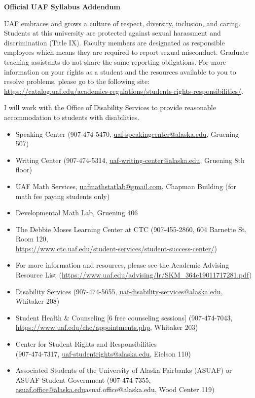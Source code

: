 \documentclass[12pt]{article}
\def\mailto#1{\href{mailto:#1}{#1}}
\begin{document}
\begin{center}
\textbf{\large{Official UAF Syllabus Addendum}}
\end{center}


 UAF embraces and grows a culture of respect, diversity, inclusion, and caring. Students at this university are protected against sexual harassment and discrimination (Title IX). Faculty members are designated as responsible employees which means they are required to report sexual misconduct. Graduate teaching assistants do not share the same reporting obligations. For more information on your rights as a student and the resources available to you to resolve problems, please go to the following site: \\
\url{https://catalog.uaf.edu/academics-regulations/students-rights-responsibilities/}.

 I will work with the Office of Disability Services to provide reasonable accommodation to students with disabilities.

\begin{itemize}
\setlength\itemsep{0em}
        \item Speaking Center (907-474-5470,
        \mailto{uaf-speakingcenter@alaska.edu}, Gruening 507)
\item Writing Center (907-474-5314, \mailto{uaf-writing-center@alaska.edu}, Gruening 8th floor)
\item UAF Math Services, \mailto{uafmathstatlab@gmail.com}, Chapman Building (for math fee paying students only)
\item Developmental Math Lab, Gruening 406
\item The Debbie Moses Learning Center at CTC (907-455-2860, 604 Barnette St, Room 120,\\ \mailto{https://www.ctc.uaf.edu/student-services/student-success-center/})
\item For more information and resources, please see the Academic Advising Resource List (\url{https://www.uaf.edu/advising/lr/SKM_364e19011717281.pdf})
\end{itemize}

\begin{itemize}
\setlength\itemsep{0em}
\item Disability Services (907-474-5655, \mailto{uaf-disability-services@alaska.edu}, Whitaker 208)
\item Student Health \& Counseling [6 free counseling sessions] (907-474-7043, \url{https://www.uaf.edu/chc/appointments.php}, Whitaker 203)
\item Center for Student Rights and Responsibilities \\(907-474-7317, \mailto{uaf-studentrights@alaska.edu}, Eielson 110)
\item Associated Students of the University of Alaska Fairbanks (ASUAF) or ASUAF Student Government (907-474-7355, \mailto{asuaf.office@alaska.edu}{asuaf.office@alaska.edu}, Wood Center 119)
\end{itemize}
\end{document}
